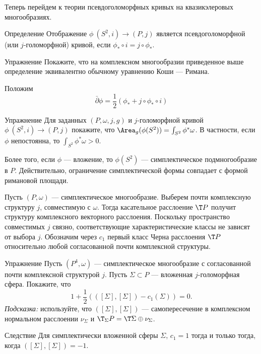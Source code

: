 Теперь перейдем к теории псевдоголоморфных кривых на квазикэлеровых многообразиях.

\begin{ex*}{Определение}
Отображение $\phi\:(S^2, i) \to (P, j)$ является псевдоголоморфной (или $j$-голоморфной) кривой, если 
$\phi_\ast \circ i = j \circ \phi_\ast$.
\end{ex*}

\begin{ex}{Упражнение}\label{10.2.D}
Покажите, что на комплексном многообразии приведенное выше определение эквивалентно обычному уравнению Коши --- Римана.
\end{ex}

Положим 
\[\bar\partial\phi=\frac12(\phi_\ast+j\circ\phi_\ast\circ i)\]

\begin{ex}[(ср. \ref{4.1.A})]{Упражнение}\label{10.2.E}
Для заданных $(P, \omega, j, g)$ и $j$-голоморфной кривой $\phi \: (S^2, i) \to (P, j)$ покажите, что $\Area_g (\phi(S^2)) = \int_{S^2}\phi^\ast \omega$.
В частности, если $\phi$ непостоянна, то $\int_{S^2} \phi^\ast \omega > 0$.
\end{ex}

Более того, если $\phi$ --- вложение, то $\phi(S^2)$ --- симплектическое подмногообразие в $P$.
Действительно, ограничение симплектической формы совпадает с формой римановой площади.

Пусть $(P, \omega)$ --- симплектическое многообразие.
Выберем почти комплексную структуру $j$, совместимую с $\omega$.
Тогда касательное расслоение $\T P$ получит структуру комплексного векторного расслоения.
Поскольку пространство совместимых $j$ связно, соответствующие характеристические классы не зависят от выбора $j$.
Обозначим через $c_1$ первый класс Черна расслоения $\T P$ относительно любой согласованной почти комплексной структуры.

\begin{ex}{Упражнение}\label{10.2.F}
Пусть $(P^4, \omega)$ --- симплектическое многообразие с согласованной почти комплексной структурой $j$.
Пусть $\Sigma \subset P$ --- вложенная $j$-голоморфная сфера.
Покажите, что
\[1 +\frac12 (([\Sigma], [\Sigma]) - c_1 (\Sigma)) = 0.\]
\emph{Подсказка:} используйте, что $([\Sigma], [\Sigma])$ --- самопересечение в комплексном нормальном расслоении $\nu_\Sigma$ и $\T_\Sigma P = \T\Sigma \oplus \nu_\Sigma$.
\end{ex}


\begin{thm*}{Следствие} Для симплектически вложенной сферы $\Sigma$, $c_1 = 1$ тогда и только тогда, когда $([\Sigma], [\Sigma]) = -1$.
\end{thm*}

